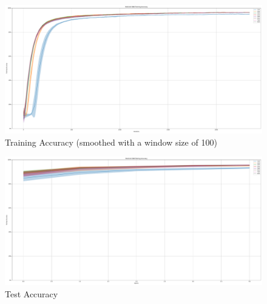         \begin{figure}[H]
            \centering
            \includegraphics[width=\textwidth]{../standard/NMNIST/plots/nmnist_train_acc.pdf}
            \caption{Training Accuracy (smoothed with a window size of 100)}            
        \end{figure}
        \begin{figure}[H]
            \centering
            \includegraphics[width=\textwidth]{../standard/NMNIST/plots/nmnist_test_acc.pdf}
            \caption{Test Accuracy}
        \end{figure}
